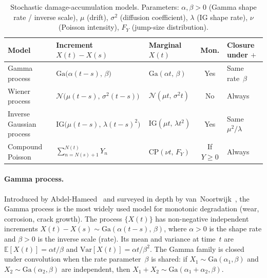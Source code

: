 \documentclass[11pt,a4paper]{article}
\theoremstyle{plain}
\theoremstyle{definition}
\theoremstyle{remark}
\begin{document}
\begin{table}[htbp]
\centering
\caption{Stochastic damage-accumulation models.
Parameters: $\alpha,\beta>0$ (Gamma shape rate / inverse scale), $\mu$ (drift), $\sigma^2$ (diffusion coefficient), $\lambda$ (IG shape rate), $\nu$ (Poisson intensity), $F_Y$ (jump-size distribution).}
\label{tab:deg_models}
\small
\begin{tabular}{@{}p{3cm}p{3.6cm}p{2.2cm}cp{3.5cm}@{}}
\toprule
\textbf{Model} & \textbf{Increment} $X(t)-X(s)$ & \textbf{Marginal} $X(t)$ & \textbf{Mon.} & \textbf{Closure under $+$} \\
\midrule
Gamma process \cite{AbdelHameed1975}
  & $\mathrm{Ga}\!\bigl(\alpha(t{-}s),\,\beta\bigr)$
  & $\mathrm{Ga}(\alpha t,\,\beta)$
  & Yes
  & Same rate~$\beta$ \\[4pt]
Wiener process \cite{WhitmoreSchenkelberg1997}
  & $\mathcal{N}\!\bigl(\mu(t{-}s),\,\sigma^2(t{-}s)\bigr)$
  & $\mathcal{N}(\mu t,\,\sigma^2 t)$
  & No
  & Always \\[4pt]
Inverse Gaussian process \cite{YeChen2014}
  & $\mathrm{IG}\!\bigl(\mu(t{-}s),\,\lambda(t{-}s)^2\bigr)$
  & $\mathrm{IG}(\mu t,\,\lambda t^2)$
  & Yes
  & Same $\mu^2/\lambda$ \\[4pt]
Compound Poisson \cite{EsaryMarshallProschan1973,Wang2022}
  & $\sum_{n=N(s)+1}^{N(t)} Y_n$
  & $\mathrm{CP}(\nu t,\,F_Y)$
  & If $Y{\ge}0$
  & Always \\
\bottomrule
\end{tabular}
\end{table}

\paragraph{Gamma process.}
Introduced by Abdel-Hameed~\cite{AbdelHameed1975} and surveyed in depth by van~Noortwijk~\cite{vanNoortwijk2009}, the Gamma process is the most widely used model for monotonic degradation (wear, corrosion, crack growth).
The process $\{X(t)\}$ has non-negative independent increments $X(t)-X(s) \sim \mathrm{Ga}(\alpha(t-s),\,\beta)$, where $\alpha>0$ is the shape rate and $\beta>0$ is the inverse scale (rate).
Its mean and variance at time~$t$ are $\mathbb{E}[X(t)] = \alpha t/\beta$ and $\mathrm{Var}[X(t)] = \alpha t/\beta^2$.
The Gamma family is closed under convolution when the rate parameter~$\beta$ is shared: if $X_1 \sim \mathrm{Ga}(\alpha_1,\beta)$ and $X_2 \sim \mathrm{Ga}(\alpha_2,\beta)$ are independent, then $X_1+X_2 \sim \mathrm{Ga}(\alpha_1+\alpha_2,\beta)$.
\end{document}
